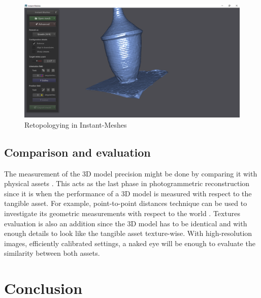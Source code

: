 \documentclass[a4paper, 12pt]{article}
\begin{document}
\begin{figure}[H]
    \centering
    \includegraphics[width=\linewidth]{images/IM.png}
    \caption{Retopologying in Instant-Meshes}
    \label{fig:two}
\end{figure}

\subsection{Comparison and evaluation}
The measurement of the 3D model precision might be done by comparing it with physical assets \cite{An2022}. This acts as the last phase in photogrammetric reconstruction since it is when the performance of a 3D model is measured with respect to the tangible asset. For example, point-to-point distances technique can be used to investigate its geometric measurements with respect to the world \cite{article}. Textures evaluation is also an addition since the 3D model has to be identical and with enough details to look like the tangible asset texture-wise. With high-resolution images, efficiently calibrated settings, a naked eye will be enough to evaluate the similarity between both assets.

\section{\textbf{Conclusion}}
\end{document}
